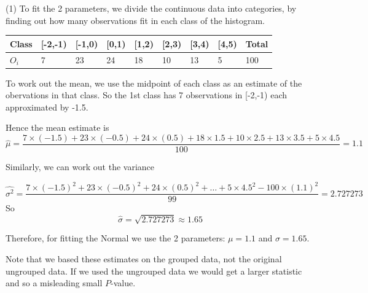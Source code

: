 \documentclass[t,xcolor=pdftex,dvipsnames,table]{beamer}\usepackage[]{graphicx}\usepackage[]{color}
\begin{document}
\begin{frame}[fragile]{}

\vspace{.5cm}
(1) To fit the 2 parameters, we divide the continuous data into categories, by finding out how many observations fit in each class of the histogram.

\vspace{.5cm}
\begin{tabular}{l|lllllll|l} 
Class & [-2,-1) & [-1,0) & [0,1) & [1,2) & [2,3) & [3,4) & [4,5) & Total  \\ \hline
$O_{i}$ & 7 & 23 & 24 & 18 & 10 & 13 & 5 & 100    \\ \hline
\end{tabular}

\vspace{.5cm}
To work out the mean, we use the midpoint of each class as an estimate of the obervations in that class.
So the 1st class has 7 observations in [-2,-1) each approximated by -1.5. 

\vspace{.5cm}
Hence the mean estimate is 
{\tiny
\[ \hat{\mu} = \frac{7 \times (-1.5) + 23 \times (-0.5) + 24 \times (0.5) + 18 \times 1.5 + 10 \times 2.5 + 13 \times 3.5 + 5 \times 4.5}{100} = 1.1 \]
}
\end{frame}

\begin{frame}[fragile]{}

Similarly, we can work out the variance

{\tiny
\[ \hat{\sigma^2} = \frac{7 \times (-1.5)^2 + 23 \times(-0.5)^2 + 24 \times (0.5)^2 + \ldots + 5 \times 4.5^2 - 100 \times (1.1)^2}{99} = 2.727273 \]
}
So 
\[ \hat{\sigma} = \sqrt{2.727273} \approx 1.65 \]

Therefore, for fitting the Normal we use the 2 parameters: $\mu = 1.1$ and $\sigma = 1.65$.

\vspace{.5cm}
Note that we based these estimates on the grouped data, not the original ungrouped data. If we used the ungrouped data we would get a larger statistic and so a misleading small $P$-value.
\end{frame}
\end{document}

